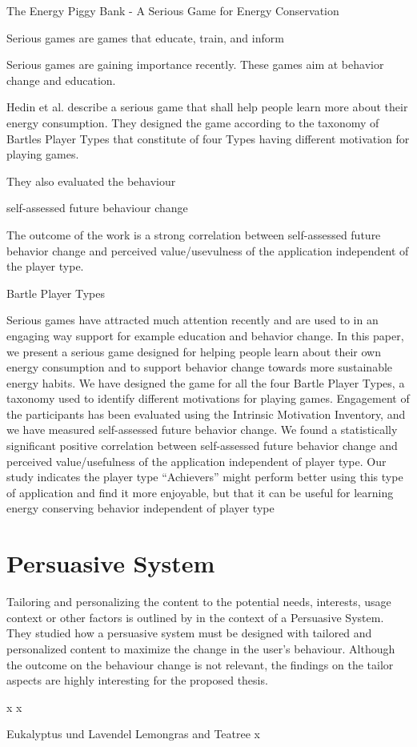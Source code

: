 The Energy Piggy Bank - A Serious Game for Energy Conservation

Serious games are games that educate, train, and inform

Serious games are gaining importance recently. These games aim at behavior change and education.

Hedin et al. \cite{Bjorn1165339} describe a serious game that shall help people learn more about their energy consumption. They designed the game according to the taxonomy of Bartles Player Types that constitute of four Types having different motivation for playing games.


They also evaluated the behaviour 

self-assessed future behaviour change 

The outcome of the work is a strong correlation between self-assessed future behavior change and perceived value/usevulness of the application independent of the player type.

Bartle Player Types

Serious games have attracted much attention recently and are used to in an engaging way support for example education and behavior change. In this paper, we present a serious game designed for helping people learn about their own energy consumption and to support behavior change towards more sustainable energy habits. We have designed the game for all the four Bartle Player Types, a taxonomy used to identify different motivations for playing games. Engagement of the participants has been evaluated using the Intrinsic Motivation Inventory, and we have measured self-assessed future behavior change. We found a statistically significant positive correlation between self-assessed future behavior change and perceived value/usefulness of the application independent of player type. Our study indicates the player type “Achievers” might perform better using this type of application and find it more enjoyable, but that it can be useful for learning energy conserving behavior independent of player type


\section{Persuasive System}
Tailoring and personalizing the content to the potential needs, interests, usage context or other factors is outlined by \cite{oinas2009persuasive} in the context of a Persuasive System. They studied how a persuasive system must be designed with tailored and personalized content to maximize the change in the user's behaviour. Although the outcome on the behaviour change is not relevant, the findings on the tailor aspects are highly interesting for the proposed thesis.

\newpage
x
\newpage
x





Eukalyptus und Lavendel
\newpage
Lemongras and Teatree
\newpage
x
\newpage

